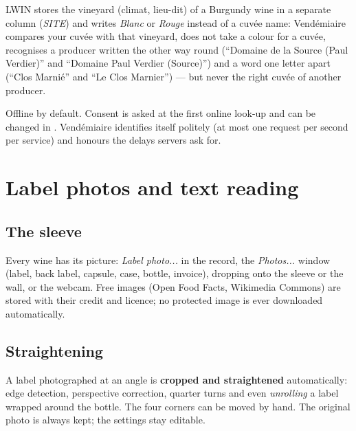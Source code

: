 \documentclass[11pt,a4paper]{article}
\begin{document}

\begin{astuce}
LWIN stores the vineyard (climat, lieu-dit) of a Burgundy wine in a separate column (\emph{SITE}) and writes
\emph{Blanc} or \emph{Rouge} instead of a cuvée name: Vendémiaire compares your cuvée with that vineyard,
does not take a colour for a cuvée, recognises a producer written the other way round (``Domaine de la
Source (Paul Verdier)'' and ``Domaine Paul Verdier (Source)'') and a word one letter apart (``Clos Marnié''
and ``Le Clos Marnier'') --- but never the right cuvée of another producer.
\end{astuce}

\begin{astuce}
Offline by default. Consent is asked at the first online look-up and can be changed in . Vendémiaire identifies itself politely (at most one request per second
per service) and honours the delays servers ask for.
\end{astuce}

\section{Label photos and text reading}
\subsection{The sleeve}
Every wine has its picture: \emph{Label photo...} in the record, the \emph{Photos...} window (label, back label,
capsule, case, bottle, invoice), dropping onto the sleeve or the wall, or the webcam. Free images (Open Food
Facts, Wikimedia Commons) are stored with their credit and licence; no protected image is ever downloaded
automatically.

\subsection{Straightening}
A label photographed at an angle is \textbf{cropped and straightened} automatically: edge detection,
perspective correction, quarter turns and even \emph{unrolling} a label wrapped around the bottle. The four
corners can be moved by hand. The original photo is always kept; the settings stay editable.
\end{document}
